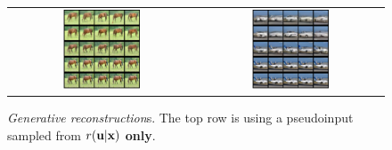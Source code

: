 \begin{figure}[t]
    \begin{tabular}{cc}
        \includegraphics[width=0.43\textwidth]{pics/5_dvp/cifar10_generative_rec_6.pdf} &
        \includegraphics[width=0.43\textwidth]{pics/5_dvp/cifar10_generative_rec_9.pdf} \\ 
    \end{tabular}
    \caption{\textit{Generative reconstruction}s. The top row is using a pseudoinput sampled from $r({\mathbf{u}}|{\mathbf{x}})$ \textbf{only}.}
    \vskip -5pt
    \label{fig:generative_recon}
\end{figure}
